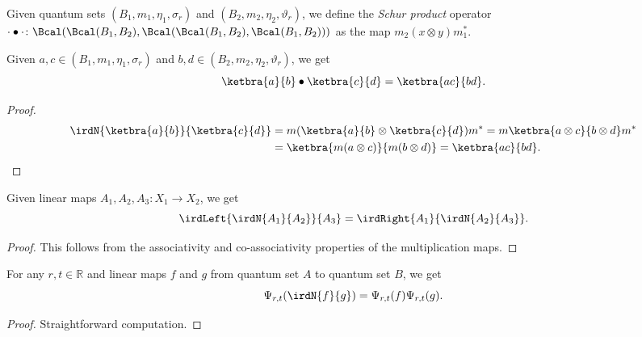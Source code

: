  \begin{definition}\label{schurMul}
  \leanok
  Given quantum sets $(B_1,m_1,\eta_1,\sigma_r)$ and $(B_2,m_2,\eta_2,\vartheta_r)$, we define the \textit{Schur product} operator $\cdot\bullet\cdot\colon\Bcal(\Bcal(B_1,B_2),\Bcal(\Bcal(B_1,B_2),\Bcal(B_1,B_2)))$ as the map $m_2(x\otimes y)m_1^*$.
 \end{definition}

 \begin{lemma}\label{schurMul.apply_rankOne}
  \leanok
  Given $a,c\in(B_1,m_1,\eta_1,\sigma_r)$ and $b,d\in(B_2,m_2,\eta_2,\vartheta_r)$, we get
  \[\ketbra{a}{b}\bullet\ketbra{c}{d}=\ketbra{ac}{bd}.\]
 \end{lemma}
 \begin{proof}
  \leanok
  \begin{align*}
   \irdN{\ketbra{a}{b}}{\ketbra{c}{d}} &= m(\ketbra{a}{b}\otimes\ketbra{c}{d})m^*
   = m\ketbra{a\otimes c}{b\otimes d}m^*\\
   &= \ketbra{m(a\otimes c)}{m(b\otimes d)}=\ketbra{ac}{bd}.
  \end{align*}
 \end{proof}

 \begin{corollary}\label{schurMul_assoc}
  \leanok
  Given linear maps $A_1,A_2,A_3\colon X_1\to X_2$, we get
  \[\irdLeft{\irdN{A_1}{A_2}}{A_3}=\irdRight{A_1}{\irdN{A_2}{A_3}}.\]
 \end{corollary}
 \begin{proof}\leanok
  This follows from the associativity and co-associativity properties of the multiplication maps.
 \end{proof}

 \begin{lemma}\label{Psi.schurMul}
  \leanok
  For any $r,t\in\mathbb{R}$ and linear maps $f$ and $g$ from quantum set $A$ to quantum set $B$, we get
  \[\Psi_{r,t}(\irdN{f}{g})=\Psi_{r,t}(f)\Psi_{r,t}(g).\]
 \end{lemma}
 \begin{proof}\leanok
  Straightforward computation.
 \end{proof}

